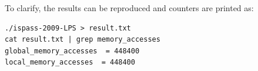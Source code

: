 \documentclass{article}
\begin{document}
To clarify, the results can be reproduced and counters are printed as:
\begin{verbatim}
./ispass-2009-LPS > result.txt
cat result.txt | grep memory_accesses
global_memory_accesses  = 448400
local_memory_accesses  = 448400
\end{verbatim}
\end{document}
